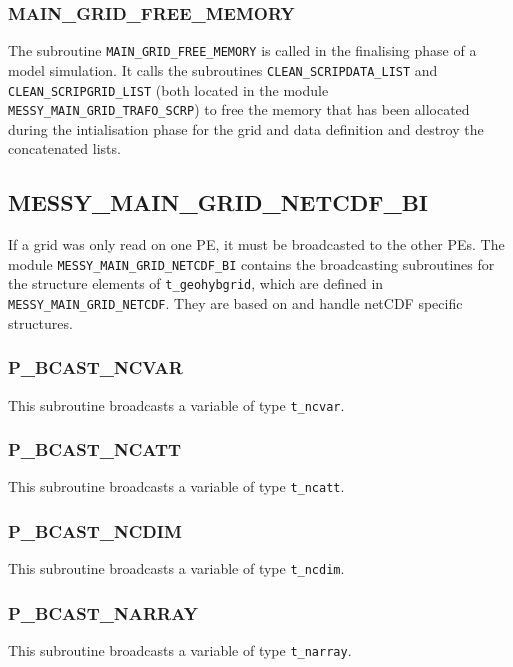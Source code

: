 \documentclass[11pt,twoside]{article}
\begin{document}
\subsubsection{MAIN\_GRID\_FREE\_MEMORY\label{MGFM}}
The subroutine \verb|MAIN_GRID_FREE_MEMORY| is called in the finalising phase
of a model simulation. It calls the subroutines \verb|CLEAN_SCRIPDATA_LIST|
and \verb|CLEAN_SCRIPGRID_LIST| (both located in the
module \verb|MESSY_MAIN_GRID_TRAFO_SCRP|) to free the memory that has been
allocated during the intialisation phase for the grid and data definition and
destroy the concatenated lists.
\clearpage
\subsection{MESSY\_MAIN\_GRID\_NETCDF\_BI\label{MMGCDFBI}}
If a grid was only read on one PE, it must be broadcasted to the other PEs.
The module \verb|MESSY_MAIN_GRID_NETCDF_BI| contains the broadcasting
subroutines for the structure elements of \verb|t_geohybgrid|, which are 
defined in \verb|MESSY_MAIN_GRID_NETCDF|. They are based on and handle
netCDF specific structures.
\subsubsection{P\_BCAST\_NCVAR\label{PBCVAR}}
This subroutine broadcasts a variable of type \verb|t_ncvar|.
\subsubsection{P\_BCAST\_NCATT\label{PBCATT}}
This subroutine broadcasts a variable of type \verb|t_ncatt|.
\subsubsection{P\_BCAST\_NCDIM\label{PBCDIM}}
This subroutine broadcasts a variable of type \verb|t_ncdim|.
\subsubsection{P\_BCAST\_NARRAY\label{PBCARR}}
This subroutine broadcasts a variable of type \verb|t_narray|.

\clearpage

\end{document}
